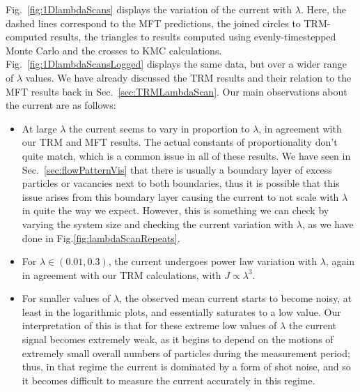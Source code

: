 Fig.~\ref{fig:1DlambdaScans} displays the variation of the current with $\lambda$. Here, the dashed lines
correspond to the MFT predictions, the joined circles to TRM-computed results, the triangles to results
computed using evenly-timestepped Monte Carlo and the crosses to KMC calculations.
Fig.~\ref{fig:1DlambdaScansLogged} displays the same data, but over a wider range of $\lambda$ values.
We have already discussed the TRM results and their relation to the MFT results back in 
Sec.~\ref{sec:TRMLambdaScan}. Our main observations about the current are as follows:
\begin{itemize}
 \item At large $\lambda$ the current seems to vary in proportion to $\lambda$, in agreement with our
 TRM and MFT results. The actual constants of proportionality don't quite match, which is a common issue
 in all of these results. We have seen in Sec.~\ref{sec:flowPatternVis} that there is usually a boundary
 layer of excess particles or vacancies next to both boundaries, thus it is possible that this issue
 arises from this boundary layer causing the current to not scale with $\lambda$ in quite the way we
 expect. However, this is something we can check by varying the system size and checking the current
 variation with $\lambda$, as we have done in Fig.\ref{fig:lambdaScanRepeats}.
 \item For $\lambda \in (0.01, 0.3)$, the current undergoes power law variation with $\lambda$, again in 
 agreement with our TRM calculations, with $J \propto \lambda^{3}$.
 \item For smaller values of $\lambda$, the observed mean current starts to become noisy, at least in the
 logarithmic plots, and essentially saturates to a low value. Our interpretation of this is that for these
 extreme low values of $\lambda$ the current signal becomes extremely weak, as it begins to depend on the
 motions of extremely small overall numbers of particles during the measurement period; thus, in that 
 regime the current is dominated by a form of shot noise, and so it becomes difficult to measure the current accurately in this regime.
\end{itemize}

